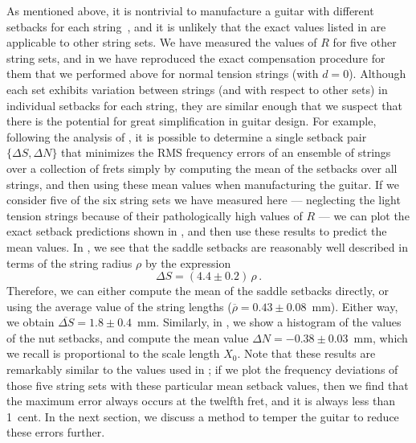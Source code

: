 As mentioned above, it is nontrivial to manufacture a guitar with different setbacks for each string~\cite{ref:byers1996cgi}, and it is unlikely that the exact values listed in  are applicable to other string sets. We have measured the values of $R$ for five other string sets, and in  we have reproduced the exact compensation procedure for them that we performed above for normal tension strings (with $d = 0$). Although each set exhibits variation between strings (and with respect to other sets) in individual setbacks for each string, they are similar enough that we suspect that there is the potential for great simplification in guitar design. For example, following the analysis of , it is possible to determine a single setback pair $\{\Delta S, \Delta N\}$ that minimizes the RMS frequency errors of an ensemble of strings over a collection of frets simply by computing the mean of the setbacks over all strings, and then using these mean values when manufacturing the guitar. If we consider five of the six string sets we have measured here --- neglecting the light tension strings because of their pathologically high values of $R$ --- we can plot the exact setback predictions shown in , and then use these results to predict the mean values. In , we see that the saddle setbacks are reasonably well described in terms of the string radius $\rho$ by the expression
\begin{equation}
  \Delta S = (4.4 \pm 0.2)\, \rho\, .
\end{equation}
Therefore, we can either compute the mean of the saddle setbacks directly, or using the average value of the string lengths ($\overline{\rho} = 0.43 \pm 0.08$~mm). Either way, we obtain $\overline{\Delta S} = 1.8 \pm 0.4$~mm. Similarly, in , we show a histogram of the values of the nut setbacks, and compute the mean value $\Delta N = -0.38 \pm 0.03$~mm, which we recall is proportional to the scale length $X_0$. Note that these results are remarkably similar to the values used in ; if we plot the frequency deviations of those five string sets with these particular mean setback values, then we find that the maximum error always occurs at the twelfth fret, and it is always less than 1~cent. In the next section, we discuss a method to temper the guitar to reduce these errors further.

